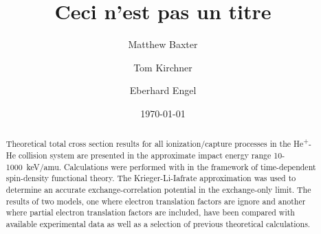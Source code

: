 \documentclass[aps, pra, reprint, groupedaddress, amsfonts,
               amsmath, amssymb, showpacs, nofootinbib]{revtex4-1}
\begin{document}
\title{Ceci n'est pas un titre}
\author{Matthew Baxter}
\author{Tom Kirchner}
\author{Eberhard Engel}
\date{\today}

\begin{abstract}

   Theoretical total cross section results for all ionization/capture processes in the
   He\textsuperscript{+}-He collision system are presented in the approximate impact energy range
   10-1000~keV/amu. Calculations were performed with in the framework of time-dependent spin-density
   functional theory. The Krieger-Li-Iafrate approximation was used to determine an accurate 
   exchange-correlation potential in the exchange-only limit. The results of two models, one where
   electron translation factors are ignore and another where partial electron translation factors are
   included, have been compared with available experimental data as well as a selection of previous
   theoretical calculations.

\end{abstract}


\maketitle
\end{document}
